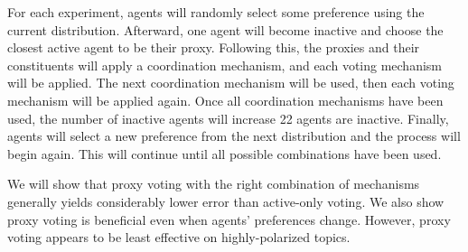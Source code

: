For each experiment, agents will randomly select some preference using the current
distribution.
Afterward, one agent
will become inactive and choose the closest active agent to be their proxy.
Following this, the proxies and their constituents will apply a coordination
mechanism, and each voting mechanism will be applied.
The next coordination mechanism will be used, then each voting mechanism will be
applied again.
Once all coordination mechanisms have been used, the number of inactive agents will
increase 22 agents are inactive.
Finally, agents will select a new preference from the next distribution and the
process will begin again.
This will continue until all possible combinations have been used.  

We will show that proxy voting with the right combination of mechanisms generally
yields considerably lower error than active-only voting.
We also show proxy voting is beneficial even when agents' preferences change.
However, proxy voting appears to be least effective on highly-polarized topics.

